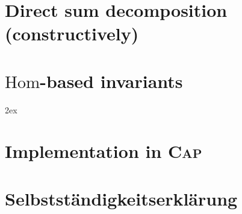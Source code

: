 \documentclass[a4paper,12pt,twoside]{article}
\begin{document}
\section{Direct sum decomposition (constructively)}\label{sec:direct_sum_decompositon}


\section{$\mathrm{Hom}$-based invariants}\label{sec:hom_based_invariants}






\cleardoublepage
{}
\begingroup
     \parindent 0pt
     \parskip 2ex
     \def\enotesize{\normalsize}
     \theendnotes
\endgroup 

\cleardoublepage
{}


\appendix
\renewcommand{\thesection}{\Alph{section}}
\section{Implementation in \textsc{Cap}}


\cleardoublepage
\section{Selbstst\"andigkeitserkl\"arung}

\end{document}
